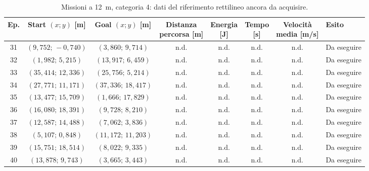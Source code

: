 \begin{table}[H]
\centering
\caption{Missioni a 12~m, categoria 4: dati del riferimento rettilineo ancora da acquisire.}
\label{tab:big-map-12m-baseline-cat4}
\begingroup
\fontsize{9}{11}\selectfont
\setlength{\tabcolsep}{2.5pt}
\renewcommand{\arraystretch}{1.2}
\begin{tabular}{@{}c cc cccc l@{}}
\toprule
Ep. & \shortstack{Start $(x;y)$\\{}[m]} & \shortstack{Goal $(x;y)$\\{}[m]} & \shortstack{Distanza\\percorsa [m]} & \shortstack{Energia\\{}[J]} & \shortstack{Tempo\\{}[s]} & \shortstack{Velocità\\media [m/s]} & Esito \\
\midrule
31 & $(9{,}752;\,-0{,}740)$ & $(3{,}860;\,9{,}714)$ & n.d. & n.d. & n.d. & n.d. & Da eseguire \\
32 & $(1{,}982;\,5{,}215)$ & $(13{,}917;\,6{,}459)$ & n.d. & n.d. & n.d. & n.d. & Da eseguire \\
33 & $(35{,}414;\,12{,}336)$ & $(25{,}756;\,5{,}214)$ & n.d. & n.d. & n.d. & n.d. & Da eseguire \\
34 & $(27{,}771;\,11{,}171)$ & $(37{,}336;\,18{,}417)$ & n.d. & n.d. & n.d. & n.d. & Da eseguire \\
35 & $(13{,}477;\,15{,}709)$ & $(1{,}666;\,17{,}829)$ & n.d. & n.d. & n.d. & n.d. & Da eseguire \\
36 & $(16{,}080;\,18{,}391)$ & $(9{,}728;\,8{,}210)$ & n.d. & n.d. & n.d. & n.d. & Da eseguire \\
37 & $(12{,}587;\,14{,}488)$ & $(7{,}062;\,3{,}836)$ & n.d. & n.d. & n.d. & n.d. & Da eseguire \\
38 & $(5{,}107;\,0{,}848)$ & $(11{,}172;\,11{,}203)$ & n.d. & n.d. & n.d. & n.d. & Da eseguire \\
39 & $(15{,}751;\,18{,}514)$ & $(8{,}022;\,9{,}335)$ & n.d. & n.d. & n.d. & n.d. & Da eseguire \\
40 & $(13{,}878;\,9{,}743)$ & $(3{,}665;\,3{,}443)$ & n.d. & n.d. & n.d. & n.d. & Da eseguire \\
\bottomrule
\end{tabular}
\endgroup
\end{table}
